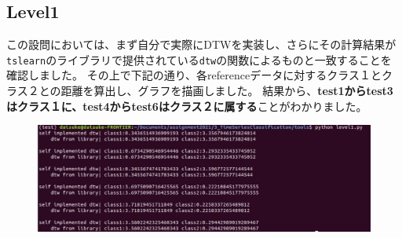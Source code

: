 \newpage

\subsection*{Level1}
この設問においては、まず自分で実際にDTWを実装し、さらにその計算結果が\verb+tslearn+のライブラリで提供されている\verb+dtw+の関数によるものと一致することを確認しました。
その上で下記の通り、各referenceデータに対するクラス１とクラス２との距離を算出し、グラフを描画しました。
結果から、\textbf{test1からtest3はクラス１に、test4からtest6はクラス２に属する}ことがわかりました。

\begin{figure}[h]
\centering
\includegraphics[scale=0.6]{./pic/level1/level1.pdf}
\end{figure}

